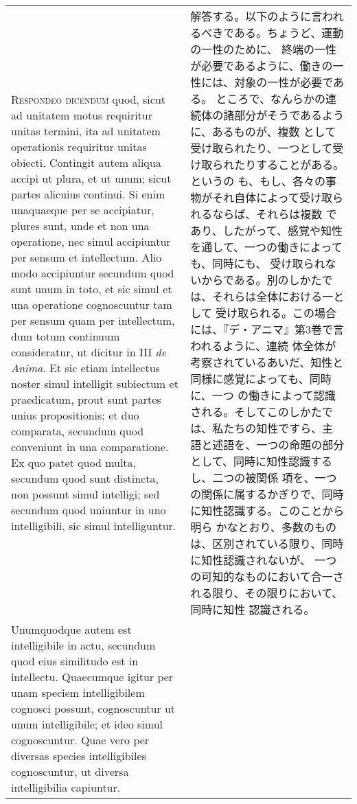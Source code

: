 \documentclass[10pt]{jsarticle} %
\begin{document}
\begin{longtable}{p{21em}p{21em}}
{\scshape Respondeo dicendum} quod, sicut ad unitatem
motus requiritur unitas termini, ita ad unitatem operationis requiritur
unitas obiecti. Contingit autem aliqua accipi ut plura, et ut unum;
sicut partes alicuius continui. Si enim unaquaeque per se accipiatur,
plures sunt, unde et non una operatione, nec simul accipiuntur per
sensum et intellectum. Alio modo accipiuntur secundum quod sunt unum in
toto, et sic simul et una operatione cognoscuntur tam per sensum quam
per intellectum, dum totum continuum consideratur, ut dicitur in III {\itshape de
Anima}. Et sic etiam intellectus noster simul intelligit subiectum et
praedicatum, prout sunt partes unius propositionis; et duo comparata,
secundum quod conveniunt in una comparatione. 
Ex quo patet quod multa,
secundum quod sunt distincta, non possunt simul intelligi; sed secundum
quod uniuntur in uno intelligibili, sic simul intelliguntur. 


&

解答する。以下のように言われるべきである。ちょうど、運動の一性のために、
終端の一性が必要であるように、働きの一性には、対象の一性が必要である。
ところで、なんらかの連続体の諸部分がそうであるように、あるものが、複数
として受け取られたり、一つとして受け取られたりすることがある。というの
も、もし、各々の事物がそれ自体によって受け取られるならば、それらは複数
であり、したがって、感覚や知性を通して、一つの働きによっても、同時にも、
受け取られないからである。別のしかたでは、それらは全体における一として
受け取られる。この場合には、『デ・アニマ』第3巻で言われるように、連続
体全体が考察されているあいだ、知性と同様に感覚によっても、同時に、一つ
の働きによって認識される。そしてこのしかたでは、私たちの知性ですら、主
語と述語を、一つの命題の部分として、同時に知性認識するし、二つの被関係
項を、一つの関係に属するかぎりで、同時に知性認識する。このことから明ら
かなとおり、多数のものは、区別されている限り、同時に知性認識されないが、
一つの可知的なものにおいて合一される限り、その限りにおいて、同時に知性
認識される。


\\



Unumquodque
autem est intelligibile in actu, secundum quod eius similitudo est in
intellectu. Quaecumque igitur per unam speciem intelligibilem cognosci
possunt, cognoscuntur ut unum intelligibile; et ideo simul
cognoscuntur. Quae vero per diversas species intelligibiles
cognoscuntur, ut diversa intelligibilia capiuntur. 



&


\end{longtable}
\end{document}
